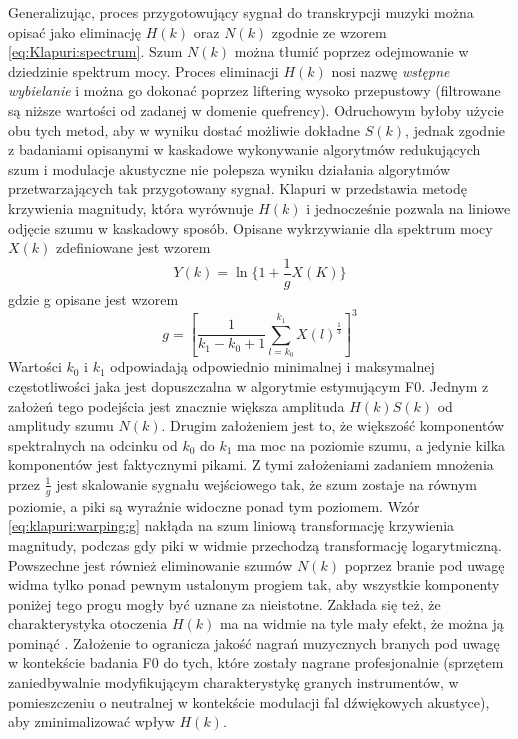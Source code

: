 \documentclass[12pt,a4paper,twoside]{mwart}
\begin{document}
Generalizując, proces przygotowujący sygnał do transkrypcji muzyki można opisać jako eliminację $H(k)$ oraz $N(k)$ zgodnie ze wzorem \ref{eq:Klapuri:spectrum}. Szum $N(k)$ można tłumić poprzez odejmowanie w dziedzinie spektrum mocy. Proces eliminacji $H(k)$ nosi nazwę \textit{wstępne wybielanie} i można go dokonać poprzez liftering wysoko przepustowy (filtrowane są niższe wartości od zadanej w domenie quefrency). Odruchowym byłoby użycie obu tych metod, aby w wyniku dostać możliwie dokładne $S(k)$, jednak zgodnie z badaniami opisanymi w 
\cite[84-86]{Transcription:Hermansky:RecognitionInNoise} 
kaskadowe wykonywanie algorytmów redukujących szum i modulacje akustyczne nie polepsza wyniku działania algorytmów przetwarzających tak przygotowany sygnał. Klapuri w 
\cite[806]{Transcription:Klapuri:MultipleFundamentalFrequencyEstimation} 
przedstawia metodę krzywienia magnitudy, która wyrównuje $H(k)$ i jednocześnie pozwala na liniowe odjęcie szumu w kaskadowy sposób. Opisane wykrzywianie dla spektrum mocy $X(k)$ zdefiniowane jest wzorem
\begin{equation}\label{eq:klapuri:warping}
  Y(k) = \ln\{ 1 + \frac{1}{g}X(K)\}
\end{equation}
gdzie g opisane jest wzorem
\begin{equation}\label{eq:klapuri:warping:g}
  g = [ \frac{1}{k_1 - k_0 + 1} \sum_{l=k_0}^{k_1}X(l)^{\frac{1}{3}}]^3
\end{equation}
Wartości $k_0$ i $k_1$ odpowiadają odpowiednio minimalnej i maksymalnej częstotliwości jaka jest dopuszczalna w algorytmie estymującym F0. Jednym z założeń tego podejścia jest znacznie większa amplituda $H(k)S(k)$ od amplitudy szumu $N(k)$. Drugim założeniem jest to, że większość komponentów spektralnych na odcinku od $k_0$ do $k_1$  ma moc na poziomie szumu, a jedynie kilka komponentów jest faktycznymi pikami. Z tymi założeniami zadaniem mnożenia przez $\frac{1}{g}$ jest skalowanie sygnału wejściowego tak, że szum zostaje na równym poziomie, a piki są wyraźnie widoczne ponad tym poziomem. Wzór \ref{eq:klapuri:warping:g} nakłąda na szum liniową transformację krzywienia magnitudy, podczas gdy piki w widmie przechodzą transformację logarytmiczną. Powszechne jest również eliminowanie szumów $N(k)$ poprzez branie pod uwagę widma tylko ponad pewnym ustalonym progiem tak, aby wszystkie komponenty poniżej tego progu mogły być uznane za nieistotne. Zakłada się też, że charakterystyka otoczenia $H(k)$ ma na widmie na tyle mały efekt, że można ją pominąć \cite{Transcription:Pertus:Inharmonicity}. Założenie to ogranicza jakość nagrań muzycznych branych pod uwagę w kontekście badania F0 do tych, które zostały nagrane profesjonalnie (sprzętem zaniedbywalnie modyfikującym charakterystykę granych instrumentów, w pomieszczeniu o neutralnej w kontekście modulacji fal dźwiękowych akustyce), aby zminimalizować wpływ $H(k)$.
\end{document}
